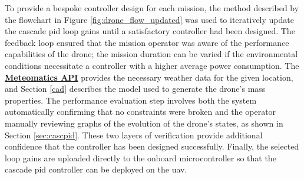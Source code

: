 To provide a bespoke controller design for each mission, the method described by the flowchart in Figure \ref{fig:drone_flow_updated} was used to iteratively update the cascade \gls{pid} loop gains until a satisfactory controller had been designed. The feedback loop ensured that the mission operator was aware of the performance capabilities of the drone; the mission duration can be varied if the environmental conditions necessitate a controller with a higher average power consumption. The \href{https://www.meteomatics.com/}{\textbf{Meteomatics API}} provides the necessary weather data for the given location, and Section \ref{cad} describes the model used to generate the drone's mass properties. The performance evaluation step involves both the system automatically confirming that no constraints were broken and the operator manually reviewing graphs of the evolution of the drone's states, as shown in Section \ref{sec:cascpid}. These two layers of verification provide additional confidence that the controller has been designed successfully. Finally, the selected loop gains are uploaded directly to the onboard microcontroller so that the cascade \gls{pid} controller can be deployed on the \gls{uav}. 

